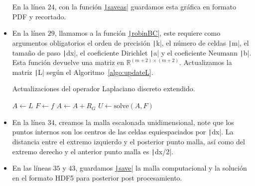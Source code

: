 \begin{itemize}
          En la línea $24$, con la función
          \href{https://docs.octave.org/latest/Printing-and-Saving-Plots.html}{\texttt|saveas|}
          guardamos esta gráfica en formato PDF y recortado.

    \item

          En la línea $29$, llamamos a la función
          \href{https://carlosal1015.github.io/mole_examples/api_docs/matlab/src/matlab/robinBC.html}{\texttt|robinBC|},
          este requiere como argumentos obligatorios el orden de
          precisión \texttt|k|, el número  de celdas
          \texttt|m|, el tamaño de paso
          \texttt|dx|, el coeficiente Dirichlet
          \texttt|a| y el coeficiente Neumann
          \texttt|b|.
          Esta función devuelve una matriz en
          \begin{math}
              \mathbb{R}^{\left(m+2\right)\times\left(m+2\right)}
          \end{math}.
          Actualizamos la matriz \texttt|L| según el
          Algoritmo~\ref{algo:updateL}.

          \begin{algorithm}[H]
              \caption{Actualizaciones del operador Laplaciano discreto extendido.}\label{algo:updateL}
              $A\leftarrow L$\;
              $F\leftarrow f$\;
              $A\leftarrow A+R_{G}$\;
              $U\leftarrow \text{solve}\left(A, F\right)$\;
          \end{algorithm}

    \item

          En la línea $34$, creamos la malla escalonada
          unidimensional, note que los puntos internos son los
          centros de las celdas equiespaciados por
          \texttt|dx|.
          La distancia entre el extremo izquierdo y el posterior
          punto malla, así como del extremo derecho y el anterior
          punto malla es \texttt|dx/2|.

    \item

          En las líneas $35$ y $43$, guardamos
          \href{https://docs.octave.org/latest/Simple-File-I_002fO.html#index-save-6}{\texttt|save|}
          la malla computacional y la solución en el formato HDF5
          para posterior post procesamiento.


\end{itemize}
